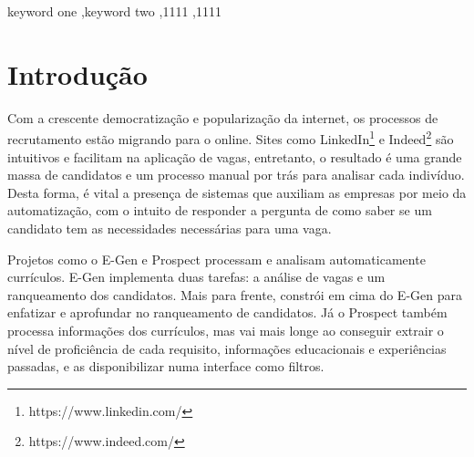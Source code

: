 \documentclass[preprint,12pt]{elsarticle}
\begin{document}
\begin{frontmatter}
\begin{abstract}
\end{abstract}



\begin{keyword}
keyword one \sep keyword two
 \sep 1111
 \sep 1111
\end{keyword}

\end{frontmatter}


\section{Introdução}
\label{sec:introducao}

Com a crescente democratização e popularização da internet, os processos de recrutamento estão migrando para o online. Sites como LinkedIn\footnote{https://www.linkedin.com/} e Indeed\footnote{https://www.indeed.com/} são intuitivos e facilitam na aplicação de vagas, entretanto, o resultado é uma grande massa de candidatos e um processo manual por trás para analisar cada indivíduo. Desta forma, é vital a presença de sistemas que auxiliam as empresas por meio da automatização, com o intuito de responder a pergunta de como saber se um candidato tem as necessidades necessárias para uma vaga.

Projetos como o E-Gen \cite{e-gen-job-processing-2007} e Prospect \cite{Singh2010PROSPECTAS} processam e analisam automaticamente currículos. E-Gen implementa duas tarefas: a análise de vagas e um ranqueamento dos candidatos. Mais para frente, \cite{improve-ranking-candidates-2009} constrói em cima do E-Gen \cite{e-gen-job-processing-2007} para enfatizar e aprofundar no ranqueamento de candidatos. Já o Prospect também processa informações dos currículos, mas vai mais longe ao conseguir extrair o nível de proficiência de cada requisito, informações educacionais e experiências passadas, e as disponibilizar numa interface como filtros.
\end{document}
